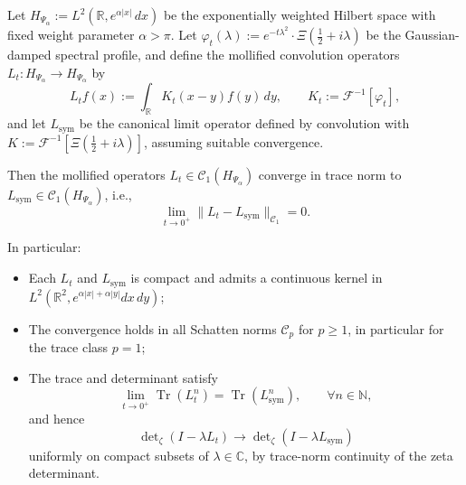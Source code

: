 \begin{lemma}
\label{lem:kernel-trace-norm-convergence}
Let \( H_{\Psi_\alpha} := L^2(\mathbb{R}, e^{\alpha |x|} \, dx) \) be the exponentially weighted Hilbert space with fixed weight parameter \( \alpha > \pi \). Let \( \varphi_t(\lambda) := e^{-t\lambda^2} \cdot \Xi\left( \tfrac{1}{2} + i\lambda \right) \) be the Gaussian-damped spectral profile, and define the mollified convolution operators \( L_t \colon H_{\Psi_\alpha} \to H_{\Psi_\alpha} \) by
\[
L_t f(x) := \int_{\mathbb{R}} K_t(x - y) f(y) \, dy, \qquad K_t := \mathcal{F}^{-1}[\varphi_t],
\]
and let \( L_{\mathrm{sym}} \) be the canonical limit operator defined by convolution with \( K := \mathcal{F}^{-1}[\Xi(\tfrac{1}{2} + i\lambda)] \), assuming suitable convergence.

\medskip
\noindent
Then the mollified operators \( L_t \in \mathcal{C}_1(H_{\Psi_\alpha}) \) converge in trace norm to \( L_{\mathrm{sym}} \in \mathcal{C}_1(H_{\Psi_\alpha}) \), i.e.,
\[
\lim_{t \to 0^+} \| L_t - L_{\mathrm{sym}} \|_{\mathcal{C}_1} = 0.
\]

\medskip
\noindent
In particular:
\begin{itemize}
  \item Each \( L_t \) and \( L_{\mathrm{sym}} \) is compact and admits a continuous kernel in \( L^2(\mathbb{R}^2, e^{\alpha|x| + \alpha|y|} dx \, dy) \);
  \item The convergence holds in all Schatten norms \( \mathcal{C}_p \) for \( p \ge 1 \), in particular for the trace class \( p = 1 \);
  \item The trace and determinant satisfy
  \[
  \lim_{t \to 0^+} \operatorname{Tr}(L_t^n) = \operatorname{Tr}(L_{\mathrm{sym}}^n), \qquad \forall n \in \mathbb{N},
  \]
  and hence
  \[
  \det\nolimits_\zeta(I - \lambda L_t) \to \det\nolimits_\zeta(I - \lambda L_{\mathrm{sym}})
  \]
  uniformly on compact subsets of \( \lambda \in \mathbb{C} \), by trace-norm continuity of the zeta determinant.
\end{itemize}
\end{lemma}
